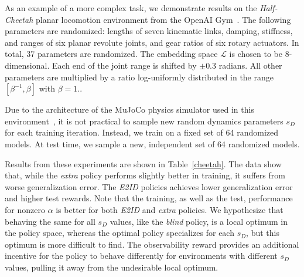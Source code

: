 \documentclass{article}
\newcommand{\cL}{\mathcal{L}}
\newcommand{\blind}{\emph{blind}}
\newcommand{\extra}{\emph{extra}}
\newcommand{\embed}{\emph{E2ID}}
\newcommand{\latent}{\cL}
\begin{document}
As an example of a more complex task, we demonstrate results on the \emph{Half-Cheetah}
planar locomotion environment from the OpenAI Gym~\citep{openai-gym}.
The following parameters are randomized:
lengths of seven kinematic links,
damping, stiffness, and ranges of six planar revolute joints,
and gear ratios of six rotary actuators.
In total, 37 parameters are randomized.
The embedding space $\latent$ is chosen to be 8-dimensional.
Each end of the joint range is shifted by $\pm 0.3$ radians.
All other parameters are multiplied by a ratio log-uniformly distributed in the range $[\beta^{-1}, \beta]$ with $\beta = 1.$.

Due to the architecture of the MuJoCo physics simulator used in this environment~\citep{todorov-mujoco},
it is not practical to sample new random dynamics parameters $s_D$ for each training iteration.
Instead, we train on a fixed set of 64 randomized models.
At test time, we sample a new, independent set of 64 randomized models.

Results from these experiments are shown in Table~\ref{cheetah}.
The data show that, while the \extra{} policy performs slightly better in training,
it suffers from worse generalization error.
The \embed{} policies achieves lower generalization error and higher test rewards.
Note that the training, as well as the test, performance for nonzero $\alpha$
is better for both \embed{} and \extra{} policies.
We hypothesize that behaving the same for all $s_D$ values, like the \blind{} policy,
is a local optimum in the policy space,
whereas the optimal policy specializes for each $s_D$,
but this optimum is more difficult to find.
The observability reward provides an additional incentive
for the policy to behave differently for environments with different $s_D$ values,
pulling it away from the undesirable local optimum.
\end{document}
